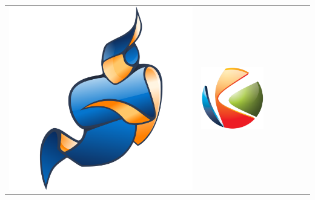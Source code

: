 \documentclass[compress]{beamer}
\begin{document}
\begin{frame}[c]
\begin{table}[]
{\begin{tabular}{rcccccc}
 \begin{minipage}{.1\textwidth}\includegraphics[width=\linewidth]{figures/jitsi.png}\end{minipage} &  
 \begin{minipage}{.1\textwidth}\includegraphics[width=\linewidth]{figures/kurento.png}\end{minipage} 

\end{tabular}}
\end{table}
\end{frame}
\end{document}
